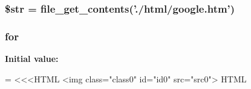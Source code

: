 \hypertarget{performance__test_8php_a7542d95618011800c61773127fa625cf}{
\subsubsection[{\$str}]{\setlength{\rightskip}{0pt plus 5cm}\$str = file\+\_\+get\+\_\+contents('./html/google.\+htm')}}\label{performance__test_8php_a7542d95618011800c61773127fa625cf}
\hypertarget{performance__test_8php_a065fe5fb0983b8ad1da651824f539ccd}{
\subsubsection[{for}]{\setlength{\rightskip}{0pt plus 5cm}for}}\label{performance__test_8php_a065fe5fb0983b8ad1da651824f539ccd}
{\bfseries Initial value\+:}
\begin{DoxyCode}
= <<<HTML
<img \textcolor{keyword}{class}=\textcolor{stringliteral}{"class0"} \textcolor{keywordtype}{id}=\textcolor{stringliteral}{"id0"} src=\textcolor{stringliteral}{"src0"}>
HTML
\end{DoxyCode}
